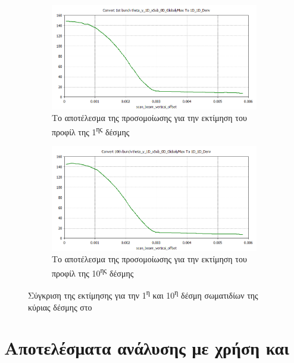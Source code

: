\begin{figure}[tph]	
	\centering
	\begin{subfigure}{0.8\textwidth}
		\includegraphics[width=\linewidth]{figures/CST-EBS-implementation/CST-EBS-1st-bunch-thetay}
		\centering
		\caption{Το αποτέλεσμα της προσομοίωσης για την εκτίμηση του προφίλ της 1\textsuperscript{ης} δέσμης}
		\label{fig:CST-EBS-1st-bunch-thetay}
	\end{subfigure}
	\hfill
	\begin{subfigure}{0.8\textwidth}
		\includegraphics[width=\linewidth]{figures/CST-EBS-implementation/CST-EBS-10th-bunch-thetay}
		\centering
		\caption{Το αποτέλεσμα της προσομοίωσης για την εκτίμηση του προφίλ της 10\textsuperscript{ης} δέσμης}
		\label{fig:CST-EBS-10th-bunch-thetay}
	\end{subfigure}
\caption{Σύγκριση της εκτίμησης για την 1\textsuperscript{η} και 10\textsuperscript{η} δέσμη
σωματιδίων της κύριας δέσμης στο }
\label{fig:CST-EBS-implementation}
\end{figure}




\section{Αποτελέσματα ανάλυσης με χρήση  και }




